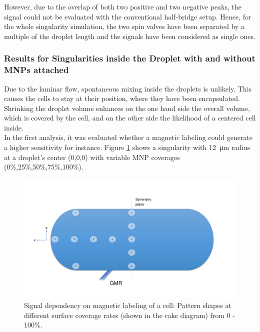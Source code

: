 However, due to the overlap of both two positive and two negative peaks, the signal could not be evaluated with the conventional half-bridge setup. Hence, for the whole singularity simulation, the two spin valves have been separated by a multiple of the droplet length and the signals have been considered as single ones.
\newpage
\subsubsection{Results for Singularities inside the Droplet with and without MNPs attached}
Due to the laminar flow, spontaneous mixing inside the droplets is unlikely. This causes the cells to stay at their position, where they have been encapsulated. Shrinking the droplet volume enhances on the one hand side the overall volume, which is covered by the cell, and on the other side the likelihood of a centered cell inside. \\
In the first analysis, it was evaluated whether a magnetic labeling could generate a higher sensitivity for instance. Figure \ref{fig:sim:encapsulation:signal} shows a singularity with \SI{12}{\micro\meter} radius at a droplet's center (0,0,0) with variable MNP coverages (0\%,25\%,50\%,75\%,100\%).

\begin{figure}[h]
	\centering
	\includegraphics[page=2,clip,trim={0mm 0mm 0mm 0mm},width=\linewidth]{Ressourcen/Results/Singularity/Cell_Encapsulation}
	\caption{Signal dependency on magnetic labeling of a cell: Pattern shapes at different surface coverage rates (shown in the cake diagram) from 0 - 100\%.}
	\label{fig:sim:encapsulation:signal}
\end{figure}

